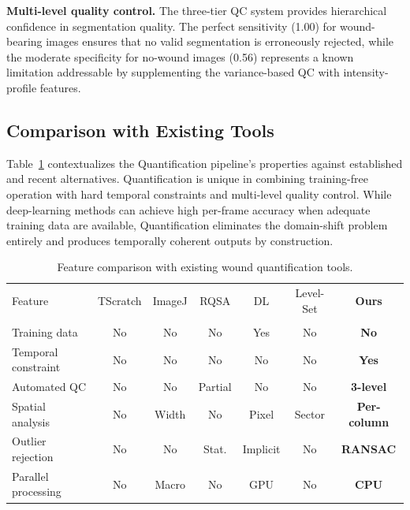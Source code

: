 \textbf{Multi-level quality control.} The three-tier QC system provides hierarchical confidence in segmentation quality. The perfect sensitivity (1.00) for wound-bearing images ensures that no valid segmentation is erroneously rejected, while the moderate specificity for no-wound images (0.56) represents a known limitation addressable by supplementing the variance-based QC with intensity-profile features.

\subsection{Comparison with Existing Tools}

Table~\ref{tab:comparison} contextualizes the Quantification pipeline's properties against established and recent alternatives. Quantification is unique in combining training-free operation with hard temporal constraints and multi-level quality control. While deep-learning methods can achieve high per-frame accuracy when adequate training data are available, Quantification eliminates the domain-shift problem entirely and produces temporally coherent outputs by construction.

\begin{table}[t]
  \centering
  \caption{Feature comparison with existing wound quantification tools.}\label{tab:comparison}
  \small
  \begin{tabular}{lcccccc}
    \toprule
    Feature & TScratch & ImageJ & RQSA & DL & Level-Set & \textbf{Ours} \\
    & \citep{Gebaeck2009} & \citep{SuarezArnedo2020} & \citep{Vargas2016} & \citep{Dogru2024} & \citep{Martinotti2025} & \\
    \midrule
    Training data     & No  & No    & No      & Yes     & No    & \textbf{No} \\
    Temporal constraint & No  & No  & No      & No      & No    & \textbf{Yes} \\
    Automated QC      & No  & No    & Partial & No      & No    & \textbf{3-level} \\
    Spatial analysis   & No  & Width & No      & Pixel   & Sector & \textbf{Per-column} \\
    Outlier rejection  & No  & No   & Stat.   & Implicit & No   & \textbf{RANSAC} \\
    Parallel processing & No & Macro & No     & GPU     & No    & \textbf{CPU} \\
    \bottomrule
  \end{tabular}
\end{table}

